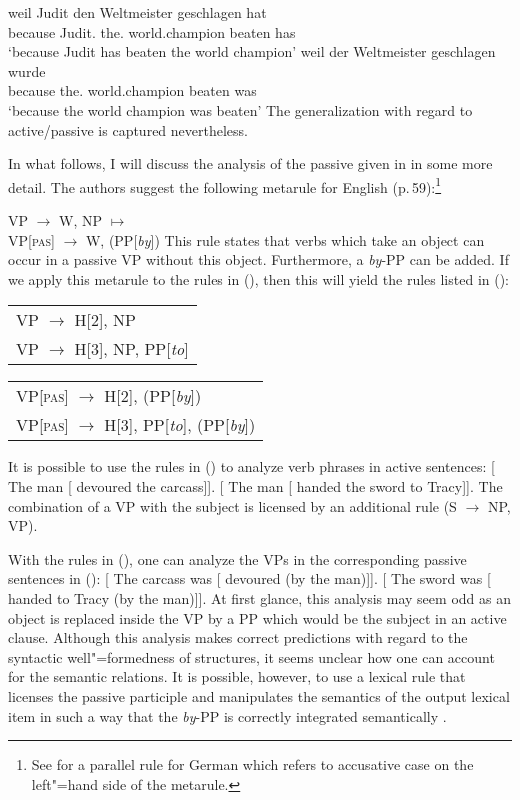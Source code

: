 \eal
\ex 
\gll weil Judit den Weltmeister geschlagen hat\\
     because Judit.\nom{} the.\acc{} world.champion beaten has\\
\glt `because Judit has beaten the world champion'
\ex 
\gll weil der Weltmeister geschlagen wurde\\
     because the.\nom{} world.champion beaten was\\
\glt `because the world champion was beaten'
\zl
%
The generalization with regard to active/passive is captured nevertheless.

In what follows, I will discuss the analysis of the passive given in  in some more detail. The authors suggest the following metarule
for English (p.\,59):\footnote{%
  See  for a parallel rule for German which refers to accusative case on the left"=hand side of the metarule.
}

\ea
VP  $\to$ W, NP $\mapsto$\\
VP[\textsc{pas}]  $\to$ W, (PP[\emph{by}])
\z
This rule states that verbs which take an object can occur in a passive VP without this object. Furthermore, a \emph{by}-PP can be added.
If we apply this metarule to the rules in (), then this will yield the rules listed in ():
\ea
\begin{tabular}[t]{@{}l@{}}
VP $\to$ H[2], NP\\
VP $\to$ H[3], NP, PP[\emph{to}]\\
\end{tabular}
\z
\ea
\begin{tabular}[t]{@{}l@{}}
VP[\textsc{pas}] $\to$ H[2], (PP[\emph{by}])\\
VP[\textsc{pas}] $\to$ H[3], PP[\emph{to}], (PP[\emph{by}])\\
\end{tabular}
\z
It is possible to use the rules in () to analyze verb phrases in active sentences:
\eal
\ex{} [ The man [ devoured the carcass]].
\ex{} [ The man [ handed the sword to Tracy]].
\zl
The combination of a VP with the subject is licensed by an additional rule (S $\to$ NP,
VP).

With the rules in (), one can analyze the VPs in the corresponding passive sentences in
(): 
\eal
\ex{} [ The carcass was [ devoured (by the man)]].
\ex{} [ The sword was [ handed to Tracy (by the man)]].
\zl
%
At first glance, this analysis may seem odd as an object is replaced inside the VP by a PP which would be the subject in an
active clause. Although this analysis makes correct predictions with regard to the syntactic well"=formedness of structures, it
seems unclear how one can account for the semantic relations. It is possible, however, to use a
lexical rule that licenses the passive participle and manipulates the semantics of
the output lexical item in such a way that the \emph{by}-PP is correctly integrated semantically \citep[]{GKPS85a}.

